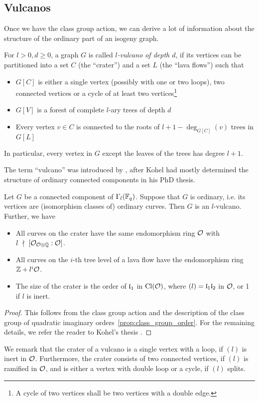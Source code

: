 \subsection{Vulcanos}
Once we have the class group action, we can derive a lot of information about the structure of the ordinary part of an isogeny graph.
\begin{definition}
    For $l > 0, d \geq 0$, a graph $G$ is called \emph{$l$-vulcano of depth $d$}, if its vertices can be partitioned into a set $C$ (the ``crater'') and a set $L$ (the ``lava flows'') such that
    \begin{itemize}
        \item $G[C]$ is either a single vertex (possibly with one or two loops), two connected vertices or a cycle of at least two vertices\footnote{A cycle of two vertices shall be two vertices with a double edge.}
        \item $G[V]$ is a forest of complete $l$-ary trees of depth $d$
        \item Every vertex $v \in C$ is connected to the roots of $l + 1 - \deg_{G[C]}(v)$ trees in $G[L]$
    \end{itemize}
    In particular, every vertex in $G$ except the leaves of the trees has degree $l + 1$.
\end{definition}
The term ``vulcano'' was introduced by \cite{isogeny_vulcano}, after Kohel had mostly determined the structure of ordinary connected components in his PhD thesis.
\begin{theorem}
    \label{prop:isogeny_vulcano}
    Let $G$ be a connected component of $\Gamma_l(\mathbb{F}_q)$.
    Suppose that $G$ is ordinary, i.e. its vertices are (isomorphism classes of) ordinary curves.
    Then $G$ is an $l$-vulcano.
    Further, we have
    \begin{itemize}
        \item All curves on the crater have the same endomorphism ring $\mathcal{O}$ with $l \ \nmid \  [\mathcal{O}_{\mathcal{O} \otimes \mathbb{Q}} : \mathcal{O}]$.
        \item All curves on the $i$-th tree level of a lava flow have the endomorphism ring $\mathbb{Z} + l^i\mathcal{O}$.
        \item The size of the crater is the order of $\mathfrak{l}_1$ in $\mathrm{Cl}(\mathcal{O})$, where $(l) = \mathfrak{l}_1\mathfrak{l}_2$ in $\mathcal{O}$, or 1 if $l$ is inert.
    \end{itemize} 
\end{theorem}
\begin{proof}
    This follows from the class group action and the description of the class group of quadratic imaginary orders~\ref{prop:class_group_order}.
    For the remaining details, we refer the reader to Kohel's thesis \cite[Prop.~23]{kohel}.
\end{proof}
We remark that the crater of a vulcano is a single vertex with a loop, if $(l)$ is inert in $\mathcal{O}$.
Furthermore, the crater consists of two connected vertices, if $(l)$ is ramified in $\mathcal{O}$, and is either a vertex with double loop or a cycle, if $(l)$ splits.


